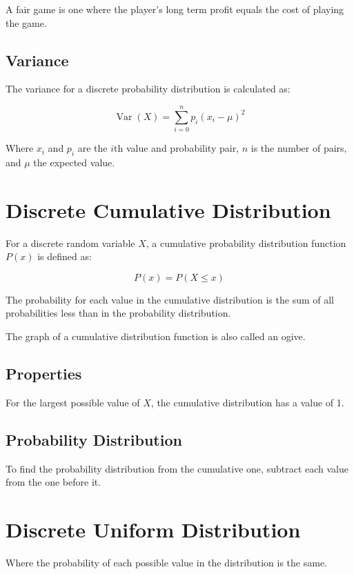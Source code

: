 \documentclass[a4paper,11pt]{article}
\DeclareMathOperator\Var{Var}
\begin{document}
A fair game is one where the player's long term profit equals the cost of
playing the game.


\subsection{Variance}

The variance for a discrete probability distribution is calculated as:

$$
\Var(X) = \sum^n_{i = 0} p_i (x_i - \mu)^2
$$

Where $x_i$ and $p_i$ are the $i$th value and probability pair, $n$ is the
number of pairs, and $\mu$ the expected value.




\section{Discrete Cumulative Distribution}

For a discrete random variable $X$, a cumulative probability distribution
function $P(x)$ is defined as:

$$
P(x) = P(X \leq x)
$$

The probability for each value in the cumulative distribution is the sum of all
probabilities less than in the probability distribution.

The graph of a cumulative distribution function is also called an ogive.


\subsection{Properties}

For the largest possible value of $X$, the cumulative distribution has a value
of 1.


\subsection{Probability Distribution}

To find the probability distribution from the cumulative one, subtract each
value from the one before it.




\section{Discrete Uniform Distribution}

Where the probability of each possible value in the distribution is the same.
\end{document}
